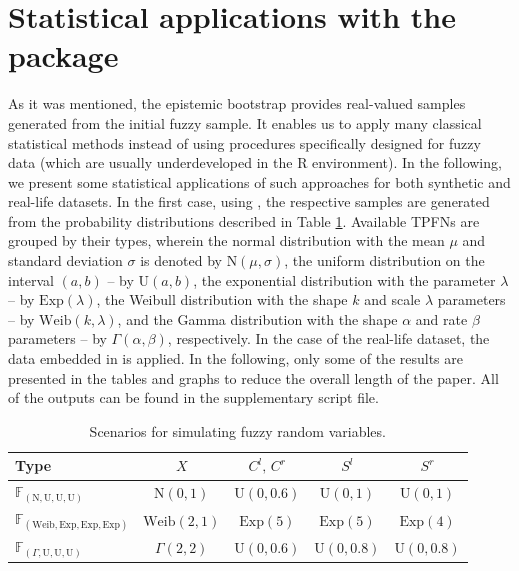 \section{Statistical applications with the package}
As it was mentioned, the epistemic bootstrap provides real-valued samples generated from the initial fuzzy sample. It enables us to apply many classical statistical methods instead of using procedures specifically designed for fuzzy data (which are usually underdeveloped in the R environment).
In the following, we present some statistical applications of such approaches for both synthetic and real-life datasets.
In the first case, using , the respective samples are generated from the probability distributions described in Table \ref{tab100}.
Available TPFNs are grouped by their types, wherein the normal distribution with the mean $\mu$ and standard deviation $\sigma$ is denoted by $\mathrm{N}(\mu,\sigma)$, the uniform distribution on the interval $(a,b)$ -- by $\mathrm{U}(a,b)$, the exponential distribution with the parameter $\lambda$ -- by $\mathrm{Exp}(\lambda)$, the Weibull distribution with the shape $k$ and scale $\lambda$ parameters -- by $\mathrm{Weib} (k,\lambda)$, and the Gamma distribution with the shape $\alpha$ and rate $\beta$ parameters  -- by $\Gamma (\alpha,\beta)$, respectively.
In the case of the real-life dataset, the data  embedded in  is applied.
In the following, only some of the results are presented in the tables and graphs to reduce the overall length of the paper.
All of the outputs can be found in the supplementary script file.
\begin{table}[htbp]
\centering
\begin{tabular}{l|cccc}
\hline 
 Type & $X$ & $C^l,\, C^r$ & $S^l$ &  $ S^r$   \\ 
\hline
$\mathbb{F}_{(\mathrm{N,U,U,U})}$ & $\mathrm{N}(0,1)$ & $\mathrm{U}(0,0.6)$ &  $\mathrm{U}(0,1)$ &  $\mathrm{U}(0,1)$  \\ 
$\mathbb{F}_{(\mathrm{Weib,Exp,Exp,Exp})}$ & $\mathrm{Weib} (2,1)$ &  $\mathrm{Exp}(5)$ & $\mathrm{Exp}(5)$ & $\mathrm{Exp}(4)$\\ 
$\mathbb{F}_{(\Gamma,\mathrm{U,U,U})}$ & $\Gamma (2,2)$ & $\mathrm{U}(0,0.6)$ &  $\mathrm{U}(0,0.8)$ &  $\mathrm{U}(0,0.8)$  \\ 
\hline
\end{tabular}
\caption{Scenarios for simulating fuzzy random variables.}\label{tab100}
\end{table}
